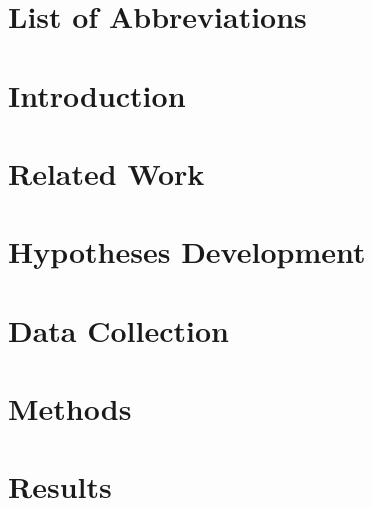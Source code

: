 \documentclass[a4paper]{article}
\begin{document}
\newpage
\hypertarget{list-of-abbreviations}{%
\section*{List of Abbreviations}\label{list-of-abbreviations}}

\newpage
\pagestyle{scrplain}  
\clearpairofpagestyles
\ofoot*{\fontsize{8pt}{0pt}\pagemark} %
\setcounter{page}{1}    %

\hypertarget{introduction}{%
\section{Introduction}\label{introduction}}

\newpage

\hypertarget{related-work}{%
\section{Related Work}\label{related-work}}

\newpage

\hypertarget{hypotheses-development}{%
\section{Hypotheses Development}\label{hypotheses-development}}

\newpage

\hypertarget{data-collection}{%
\section{Data Collection}\label{data-collection}}

\newpage

\hypertarget{methods}{%
\section{Methods}\label{methods}}

\newpage

\hypertarget{results}{%
\section{Results}\label{results}}
\end{document}
